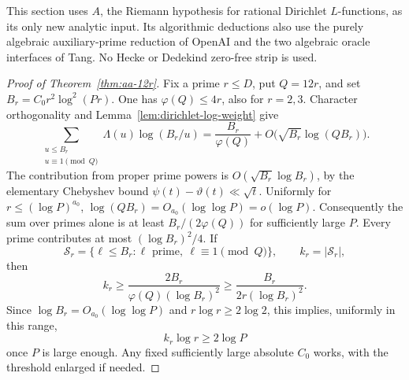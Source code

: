 \documentclass[11pt]{article}
\theoremstyle{definition}
\theoremstyle{remark}
\begin{document}
This section uses \(A\), the Riemann hypothesis for rational Dirichlet
\(L\)-functions, as its only new analytic input. Its algorithmic deductions
also use the purely algebraic auxiliary-prime reduction of OpenAI and
the two algebraic oracle interfaces of Tang. No Hecke or Dedekind
zero-free strip is used.

\begin{proof}[Proof of Theorem~\ref{thm:aa-12r}]
Fix a prime \(r\leq D\), put \(Q=12r\), and set
\(B_r=C_0r^2\log^2(Pr)\).
One has \(\varphi(Q)\leq4r\), also for \(r=2,3\).
Character orthogonality and Lemma~\ref{lem:dirichlet-log-weight} give
\[
 \sum_{\substack{u\leq B_r\\u\equiv1\pmod Q}}
       \Lambda(u)\log(B_r/u)
 =\frac{B_r}{\varphi(Q)}
       +O\bigl(\sqrt{B_r}\log(QB_r)\bigr).
\]
The contribution from proper prime powers is
\(O(\sqrt{B_r}\log B_r)\), by the elementary Chebyshev bound
\(\psi(t)-\vartheta(t)\ll\sqrt t\).
Uniformly for \(r\leq(\log P)^{a_0}\),
\(\log(QB_r)=O_{a_0}(\log\log P)=o(\log P)\).
Consequently the sum over primes alone is at least
\(B_r/(2\varphi(Q))\) for sufficiently large \(P\).
Every prime contributes at most \((\log B_r)^2/4\). If
\[
 \mathcal S_r=\{\ell\leq B_r:\ell\text{ prime},\
                                  \ell\equiv1\pmod Q\},
 \qquad k_r=|\mathcal S_r|,
\]
then
\[
 k_r\geq\frac{2B_r}{\varphi(Q)(\log B_r)^2}
       \geq\frac{B_r}{2r(\log B_r)^2}.
\]
Since \(\log B_r=O_{a_0}(\log\log P)\) and
\(r\log r\geq2\log2\), this implies, uniformly in this range,
\begin{equation}\label{eq:aa-many-primes}
 k_r\log r\geq2\log P
\end{equation}
once \(P\) is large enough. Any fixed sufficiently large absolute
\(C_0\) works, with the threshold enlarged if needed.


\end{proof}
\end{document}
